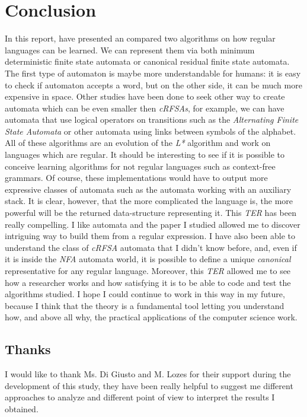 \section{Conclusion}

In this report, have presented an compared two algorithms on how regular languages can be learned. We can represent them via both minimum deterministic finite state automata or
canonical residual finite state automata. The first type of automaton is maybe more understandable for
humans: it is easy to check if automaton accepts a word, but on the other side, it can be much more
expensive in space.
Other studies have been done to seek other way to create automata which can be even smaller
then \textit{cRFSAs}, for example, we can have automata that use logical operators on transitions such as the
\textit{Alternating Finite State Automata} or other automata using links between symbols of the alphabet.
All of these algorithms are an evolution of the \textit{L*} algorithm and work on languages which are regular.
It should be interesting to see if it is possible to conceive learning algorithms for not regular languages
such as context-free grammars. Of course, these implementations would have to output more expressive
classes of automata such as the automata working with an auxiliary stack. It is clear, however, that the
more complicated the language is, the more powerful will be the returned data-structure representing it.
This \textit{TER} has been really compelling. I like automata and the paper I studied allowed me to discover
intriguing way to build them from a regular expression. I have also been able to understand the class of
\textit{cRFSA} automata that I didn’t know before, and, even if it is inside the \textit{NFA} automata world, it is possible
to define a unique \textit{canonical} representative for any regular language. Moreover, this \textit{TER} allowed me to
see how a researcher works and how satisfying it is to be able to code and test the algorithms studied. I
hope I could continue to work in this way in my future, because I think that the theory is a fundamental
tool letting you understand how, and above all why, the practical applications of the computer science
work.


\subsection{Thanks}
I would like to thank Ms. Di Giusto and M. Lozes for their support during the development of this study, they have been really helpful to suggest me different approaches to analyze and different point of view to interpret the results I obtained.